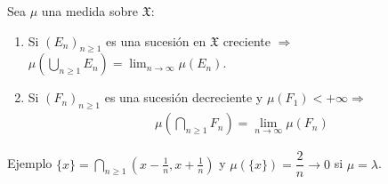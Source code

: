 \begin{lemma}
    Sea $\mu$ una medida sobre $\mathfrak{X}$:
    \begin{enumerate}
        \item Si $(E_n)_{n \geq 1}$ es una sucesión en $\mathfrak{X}$ creciente $\Rightarrow$ $\mu(\bigcup_{n \geq 1} E_n) = \lim_{n \to \infty} \mu(E_n)$.
        \item Si $(F_n)_{n \geq 1}$ es una sucesión decreciente y $\mu(F_1) < +\infty \Rightarrow$ \begin{align*}
                  \mu(\bigcap_{n \geq 1} F_n) = \lim_{n \to \infty} \mu(F_n)
              \end{align*}
    \end{enumerate}
    Ejemplo $\{ x \} = \bigcap_{n \geq 1} (x - \frac{1}{n}, x + \frac{1}{n})$ y $\mu(\{ x \}) = \dfrac{2}{n} \to 0$ si $\mu = \lambda$.


\end{lemma}

